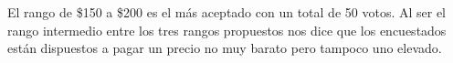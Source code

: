 
El rango de \$150 a \$200 es el más aceptado con un total de 50 votos. Al ser el rango intermedio entre los tres rangos propuestos nos dice que los encuestados están dispuestos a pagar un precio no muy barato pero tampoco uno elevado.
